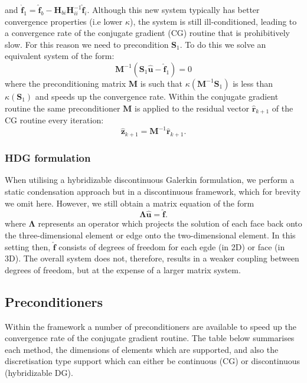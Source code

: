 and
$\hat{\mathbf{f}}_{1}=\hat{\mathbf{f}}_{b}-\mathbf{H}_{bi}
\mathbf{H}_{ii}^{-1}\hat{\mathbf{f}}_{i}$.
Although this new system typically has better convergence properties (i.e lower
$\kappa$), the system is still ill-conditioned, leading to a convergence rate of
the conjugate gradient (CG) routine that is prohibitively slow. For this reason
we need to precondition $\mathbf{S}_1$. To do this we solve an equivalent
system of the form:
%
\[
\mathbf{M}^{-1}\left(\mathbf{S}_{1} \hat{\mathbf{u}} - \hat{\mathbf{f}}_{1} \right) = 0
\]
%
where the preconditioning matrix $\mathbf{M}$ is such that
$\kappa\left(\mathbf{M}^{-1} \mathbf{S}_{1}\right)$ is less than
$\kappa\left(\mathbf{S}_{1}\right)$ and speeds up the convergence rate. Within
the conjugate gradient routine the same preconditioner $\mathbf{M}$ is applied
to the residual vector $\hat{\mathbf{r}}_{k+1}$ of the CG routine every
iteration:
%
\[
\hat{\mathbf{z}}_{k+1}=\mathbf{M}^{-1}\hat{\mathbf{r}}_{k+1}.
\]
%

\subsubsection{HDG formulation}

When utilising a hybridizable discontinuous Galerkin formulation, we perform a
static condensation approach but in a discontinuous framework, which for brevity
we omit here. However, we still obtain a matrix equation of the form
%
\[
\mathbf{\Lambda}\hat{\mathbf{u}} = \hat{\mathbf{f}}.
\]
%
where $\mathbf{\Lambda}$ represents an operator which projects the solution of
each face back onto the three-dimensional element or edge onto the
two-dimensional element. In this setting then, $\hat{\mathbf{f}}$ consists of
degrees of freedom for each egde (in 2D) or face (in 3D). The overall system
does not, therefore, results in a weaker coupling between degrees of freedom,
but at the expense of a larger matrix system.

\subsection{Preconditioners}

Within the \nekpp framework a number of preconditioners are available to speed
up the convergence rate of the conjugate gradient routine. The table below
summarises each method, the dimensions of elements which are supported, and also
the discretisation type support which can either be continuous (CG) or
discontinuous (hybridizable DG).

